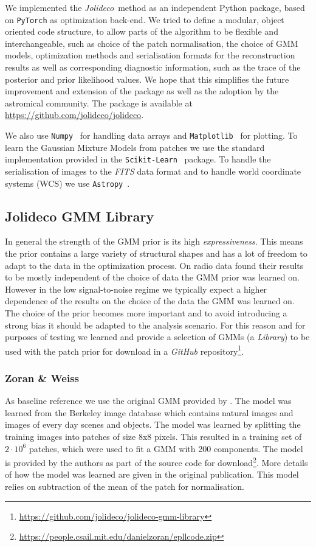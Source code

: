 \documentclass[twocolumn]{aastex631}
\newcommand{\jolideco}{\textit{Jolideco}~}
\begin{document}
    We implemented the \jolideco method as an independent Python package, based on \texttt{PyTorch} as optimization back-end. We tried to define a modular, object oriented code structure, to allow parts of the algorithm to be flexible and interchangeable, such as choice of the patch normalisation, the choice of GMM models, optimization methods and serialisation formats for the reconstruction results as well as corresponding diagnostic information, such as the trace of the posterior and prior likelihood values. We hope that this simplifies the future improvement and extension of the package as well as the adoption by the astromical community. The package is available at \url{https://github.com/jolideco/jolideco}.

    We also use \texttt{Numpy}~\citep{Numpy2020} for handling data arrays and \texttt{Matplotlib}~\citep{Hunter2007} for plotting. To learn the Gaussian Mixture Models from patches we use the standard implementation provided in the \texttt{Scikit-Learn}~\citep{scikit-learn} package. To handle the serialisation of images to the \textit{FITS} data format and to handle world coordinate systems (WCS) we use \texttt{Astropy}~\citep{Astropy2018}.

    \subsection{Jolideco GMM Library}
    \label{ssec:jolideco-gmm-library}
    In general the strength of the GMM prior is its high \textit{expressiveness}. This means the prior contains a large variety of structural shapes and has a lot of freedom to adapt to the data in the optimization process. On radio data \cite{Bouman2016} found their results to be mostly independent of the choice of data the GMM prior was learned on. However in the low signal-to-noise regime we typically expect a higher dependence of the results on the choice of the data the GMM was learned on. The choice of the prior becomes more important and to avoid introducing a strong bias it should be adapted to the analysis scenario. For this reason and for purposes of testing we learned and provide a selection of GMMs (a \textit{Library}) to be used with the patch prior for download in a \textit{GitHub} repository\footnote{\url{https://github.com/jolideco/jolideco-gmm-library}}.
    
    \subsubsection{Zoran \& Weiss}
    As baseline reference we use the original GMM provided by \cite{Zoran2011}. The model was learned from the Berkeley image database \citep{Martin2001} which contains natural images and images of every day scenes and objects. The model was learned by splitting the training images into patches of size 8x8 pixels. This resulted in a training set of $2 \cdot 10^{6}$ patches, which were used to fit a GMM with 200 components. The model is provided by the authors as part of the source code for download\footnote{\url{https://people.csail.mit.edu/danielzoran/epllcode.zip}}. More details of how the model was learned are given in the original publication. This model relies on subtraction of the mean of the patch for normalisation.
    
\end{document}
